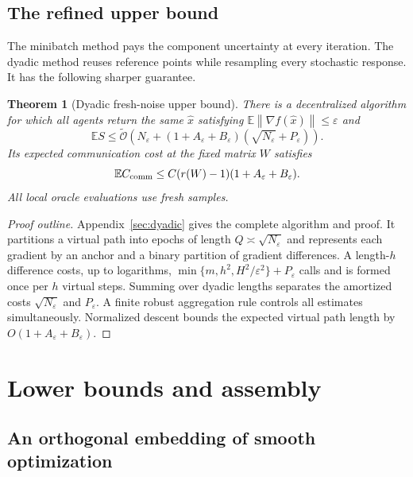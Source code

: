 \documentclass[11pt,a4paper]{article}
\newcommand{\E}{\mathbb{E}}
\newcommand{\eps}{\varepsilon}
\newcommand{\norm}[1]{\left\lVert #1\right\rVert}
\newcommand{\tO}{\widetilde{\mathcal{O}}}
\newtheorem{theorem}{Theorem}[section]
\theoremstyle{remark}
\begin{document}
\subsection{The refined upper bound}

The minibatch method pays the component uncertainty at every iteration.
The dyadic method reuses reference points while resampling every stochastic
response. It has the following sharper guarantee.

\begin{theorem}[Dyadic fresh-noise upper bound]
\label{thm:dyadic-upper}
There is a decentralized algorithm for which all agents return the same
$\widehat x$ satisfying $\E\norm{\nabla f(\widehat x)}\le\eps$ and
\begin{equation}
 \E S\le\tO\left(
 N_\eps+(1+A_\eps+B_\eps)
                    (\sqrt{N_\eps}+P_\eps)\right).
 \label{eq:dyadic-master-upper}
\end{equation}
Its expected communication cost at the fixed matrix $W$ satisfies
\begin{equation}
 \E C_{\rm comm}\le C(r(W)-1)(1+A_\eps+B_\eps).
 \label{eq:dyadic-communication}
\end{equation}
All local oracle evaluations use fresh samples.
\end{theorem}

\begin{proof}[Proof outline]
Appendix~\ref{sec:dyadic} gives the complete algorithm and proof. It
partitions a virtual path into epochs of length $Q\asymp\sqrt{N_\eps}$
and represents each gradient by an anchor and a binary partition of gradient
differences. A length-$h$ difference costs, up to logarithms,
$\min\{m,h^2,H^2/\eps^2\}+P_\eps$ calls and is formed once per $h$ virtual
steps. Summing over dyadic lengths separates the amortized costs
$\sqrt{N_\eps}$ and $P_\eps$. A finite robust aggregation rule controls
all estimates simultaneously. Normalized descent bounds the expected
virtual path length by $O(1+A_\eps+B_\eps)$.
\end{proof}

\section{Lower bounds and assembly}\label{sec:lower-main}
\subsection{An orthogonal embedding of smooth optimization}
\end{document}
